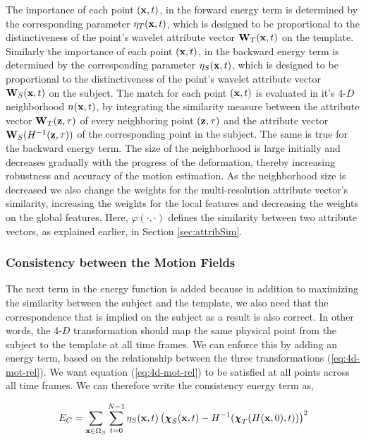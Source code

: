 The importance of each point $(\mathbf{x}, t)$, in the forward energy term is determined by the corresponding parameter $\eta_T (\mathbf{x}, t )$, which is designed to be proportional to the distinctiveness of the point's wavelet attribute vector $\mathbf{W}_T ( \mathbf{x}, t )$ on the template. Similarly the importance of each point $(\mathbf{x}, t)$, in the backward energy term is determined by the corresponding parameter $\eta_S (\mathbf{x}, t )$, which is designed to be proportional to the distinctiveness of the point's wavelet attribute vector $\mathbf{W}_S ( \mathbf{x}, t )$ on the subject. The match for each point $(\mathbf{x}, t)$ is evaluated in it's 4-$D$ neighborhood $n ( \mathbf{x}, t )$, by integrating the similarity measure between the attribute vector $\mathbf{W}_T ( \mathbf{z}, \tau )$  of every neighboring point $( \mathbf{z}, \tau )$ and the attribute vector $\mathbf{W}_S ( H^{-1} ( \mathbf{z}, \tau ) )$  of the corresponding point in the subject. The same is true for the backward energy term. The size of the neighborhood is large initially and decreases gradually with the progress of the deformation, thereby increasing robustness and accuracy of the motion estimation. As the neighborhood size is decreased we also change the weights for the multi-resolution attribute vector's similarity, increasing the weights for the local features and decreasing the weights on the global features. Here, $\varphi(\cdot,\cdot)$ defines the similarity between two attribute vectors, as explained earlier, in Section \ref{sec:attribSim}.
   
\subsubsection{Consistency between the Motion Fields}
   
The next term in the energy function is added because in addition to maximizing the similarity between the subject and the template, we also need
that the correspondence that is implied on the subject as a result is also correct. In other words, the 4-$D$ transformation should map the same physical point from the subject to the template at all time frames. We can enforce this by adding an energy term, based on the relationship between the three transformations (\ref{eq:4d-mot-rel}). We want equation (\ref{eq:4d-mot-rel}) to be satisfied at all points across all time frames. We can therefore write the consistency energy term as,

\begin{equation}
E_C = \sum_{\mathbf{x} \in \Omega_S} \sum_{t = 0}^{N - 1} \eta_S ( \mathbf{x}, t ) \left( {\boldsymbol{\chi}}_S ( \mathbf{x}, t ) - H^{-1} ( {\boldsymbol{\chi}}_T ( H (\mathbf{x}, 0 ), t ) ) \right)^2
\end{equation}

